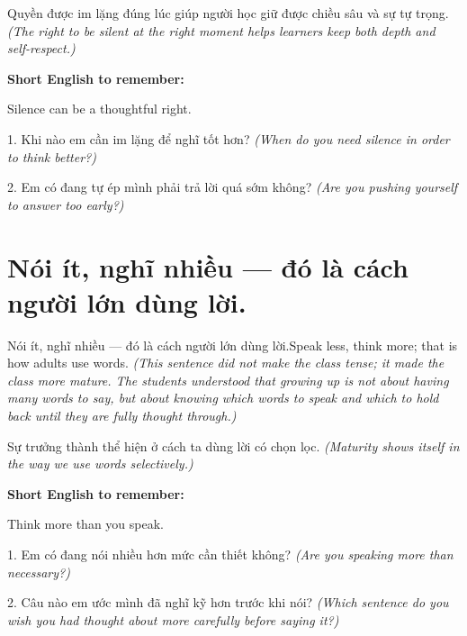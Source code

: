 \begin{baihoc}
Quyền được im lặng đúng lúc giúp người học giữ được chiều sâu và sự tự trọng.
\textit{(The right to be silent at the right moment helps learners keep both depth and self-respect.)}
\end{baihoc}

\begin{ghinhoanh}
\textbf{Short English to remember:}

Silence can be a thoughtful right.

\end{ghinhoanh}

\begin{tuhocnhanh}
1. Khi nào em cần im lặng để nghĩ tốt hơn? \textit{(When do you need silence in order to think better?)}

2. Em có đang tự ép mình phải trả lời quá sớm không? \textit{(Are you pushing yourself to answer too early?)}
\end{tuhocnhanh}
\ngancach


\section{Nói ít, nghĩ nhiều — đó là cách người lớn dùng lời.}
\begin{truyen}{Nói ít, nghĩ nhiều — đó là cách người lớn dùng lời.}{Speak less, think more; that is how adults use words.}
\textit{(This sentence did not make the class tense; it made the class more mature. The students understood that growing up is not about having many words to say, but about knowing which words to speak and which to hold back until they are fully thought through.)}
\end{truyen}

\begin{baihoc}
Sự trưởng thành thể hiện ở cách ta dùng lời có chọn lọc.
\textit{(Maturity shows itself in the way we use words selectively.)}
\end{baihoc}

\begin{ghinhoanh}
\textbf{Short English to remember:}

Think more than you speak.

\end{ghinhoanh}

\begin{tuhocnhanh}
1. Em có đang nói nhiều hơn mức cần thiết không? \textit{(Are you speaking more than necessary?)}

2. Câu nào em ước mình đã nghĩ kỹ hơn trước khi nói? \textit{(Which sentence do you wish you had thought about more carefully before saying it?)}
\end{tuhocnhanh}
\ngancach


